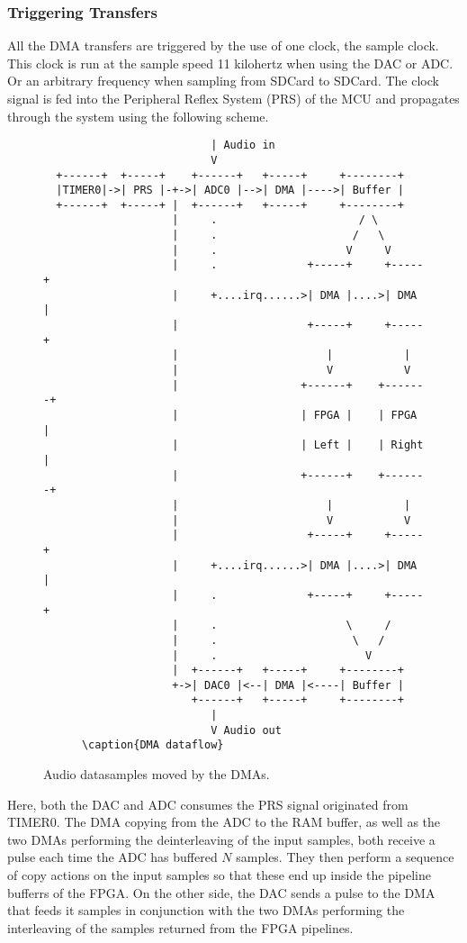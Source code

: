 \subsubsection{Triggering Transfers}

All the DMA transfers are triggered by the use of one clock, the sample clock.
This clock is run at the sample speed 11 kilohertz when using the DAC or ADC. Or
an arbitrary frequency when sampling from SDCard to SDCard. The clock signal is fed into
the Peripheral Reflex System  (PRS) of the MCU and propagates
through the system using the following scheme.

\begin{figure}[H]
  \begin{verbatim}
                          | Audio in
                          V
  +------+  +-----+    +------+   +-----+     +--------+
  |TIMER0|->| PRS |-+->| ADC0 |-->| DMA |---->| Buffer |
  +------+  +-----+ |  +------+   +-----+     +--------+
                    |     .                      / \
                    |     .                     /   \
                    |     .                    V     V
                    |     .              +-----+     +-----+
                    |     +....irq......>| DMA |....>| DMA |
                    |                    +-----+     +-----+
                    |                       |           |
                    |                       V           V
                    |                   +------+    +-------+
                    |                   | FPGA |    | FPGA  |
                    |                   | Left |    | Right |
                    |                   +------+    +-------+
                    |                       |           |
                    |                       V           V
                    |                    +-----+     +-----+
                    |     +....irq......>| DMA |....>| DMA |
                    |     .              +-----+     +-----+
                    |     .                    \     /
                    |     .                     \   /
                    |     .                       V
                    |  +------+   +-----+     +--------+
                    +->| DAC0 |<--| DMA |<----| Buffer |
                       +------+   +-----+     +--------+
                          |
                          V Audio out
      \caption{DMA dataflow}
  \end{verbatim}
  \caption{Audio datasamples moved by the DMAs.}
  \label{mcu:dma-dataflow}
\end{figure}

Here, both the DAC and ADC consumes the PRS signal originated from TIMER0. The
DMA copying from the ADC to the RAM buffer, as well as the two DMAs performing the
deinterleaving of the input samples, both receive a pulse each time the ADC has
buffered $N$ samples. They then perform a sequence of copy actions on the input
samples so that these end up inside the pipeline bufferrs of the FPGA. On the
other side, the DAC sends a pulse to the DMA that feeds it samples in conjunction
with the two DMAs performing the interleaving of the samples returned from the
FPGA pipelines.

